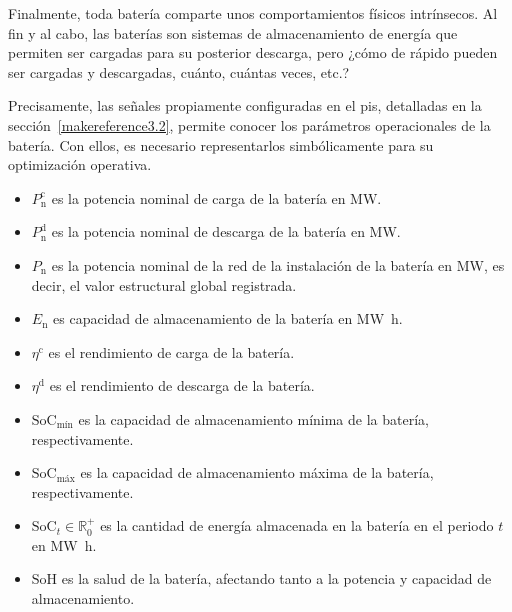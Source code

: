 Finalmente, toda batería comparte unos comportamientos físicos intrínsecos. Al fin y al cabo, las baterías son sistemas de almacenamiento de energía que permiten ser cargadas para su posterior descarga, pero ¿cómo de rápido pueden ser cargadas y descargadas, cuánto, cuántas veces, etc.?

Precisamente, las señales propiamente configuradas en el \gls{pis}, detalladas en la sección~\ref{makereference3.2}, permite conocer los parámetros operacionales de la batería. Con ellos, es necesario representarlos simbólicamente para su optimización operativa.

\begin{itemize}

  \item \( P^{\mathrm{c}}_{\mathrm{n}} \) es la potencia nominal de carga de la batería en \si{\mega\watt}.

  \item \( P^{\mathrm{d}}_{\mathrm{n}} \) es la potencia nominal de descarga de la batería en \si{\mega\watt}.

  \item \( P_{\mathrm{n}} \) es la potencia nominal de la red de la instalación de la batería en \si{\mega\watt}, es decir, el valor estructural global registrada.

  \item \( E_{\mathrm{n}} \) es capacidad de almacenamiento de la batería en \si{{\mega\watt\hour}}.

  \item \( \eta^{\mathrm{c}} \) es el rendimiento de carga de la batería.

  \item \( \eta^{\mathrm{d}} \) es el rendimiento de descarga de la batería.

  \item \( \mathrm{SoC}_{\text{mín}} \) es la capacidad de almacenamiento mínima de la batería, respectivamente.

  \item \( \mathrm{SoC}_{\text{máx}} \) es la capacidad de almacenamiento máxima de la batería, respectivamente.

  \item \( \mathrm{SoC}_{t} \in \mathbb{R}^{+}_{0} \) es la cantidad de energía almacenada en la batería en el periodo \( t \) en \si{{\mega\watt\hour}}.

  \item \( \mathrm{SoH} \) es la salud de la batería, afectando tanto a la potencia y capacidad de almacenamiento.


\end{itemize}
